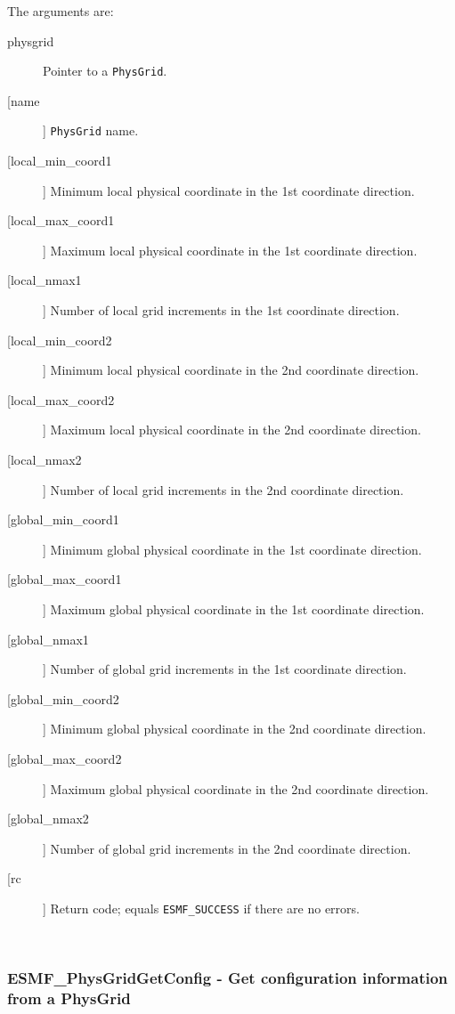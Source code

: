       The arguments are:
       \begin{description}
       \item[physgrid] 
            Pointer to a {\tt PhysGrid}.
       \item[[name]]
            {\tt PhysGrid} name.
       \item[[local\_min\_coord1]]
            Minimum local physical coordinate in the 1st coordinate direction.
       \item[[local\_max\_coord1]]
            Maximum local physical coordinate in the 1st coordinate direction.
       \item[[local\_nmax1]]
            Number of local grid increments in the 1st coordinate direction.
       \item[[local\_min\_coord2]]
            Minimum local physical coordinate in the 2nd coordinate direction.
       \item[[local\_max\_coord2]]
            Maximum local physical coordinate in the 2nd coordinate direction.
       \item[[local\_nmax2]]
            Number of local grid increments in the 2nd coordinate direction.
       \item[[global\_min\_coord1]]
            Minimum global physical coordinate in the 1st coordinate direction.
       \item[[global\_max\_coord1]]
            Maximum global physical coordinate in the 1st coordinate direction.
       \item[[global\_nmax1]]
            Number of global grid increments in the 1st coordinate direction.
       \item[[global\_min\_coord2]]
            Minimum global physical coordinate in the 2nd coordinate direction.
       \item[[global\_max\_coord2]]
            Maximum global physical coordinate in the 2nd coordinate direction.
       \item[[global\_nmax2]]
            Number of global grid increments in the 2nd coordinate direction.
       \item[[rc]] 
            Return code; equals {\tt ESMF\_SUCCESS} if there are no errors.
       \end{description}
   
 
\mbox{}\hrulefill\ 
 
\subsubsection{ESMF\_PhysGridGetConfig - Get configuration information from a PhysGrid}



